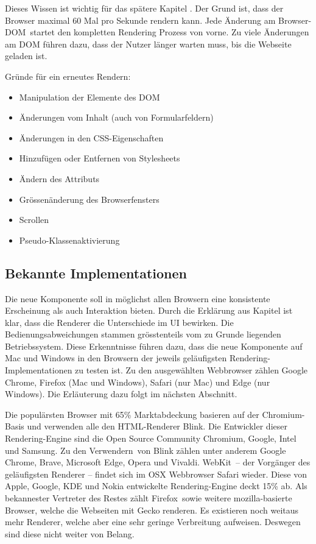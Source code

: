 Dieses Wissen ist wichtig für das spätere Kapitel . 
Der Grund ist, dass der Browser maximal 60 Mal pro Sekunde rendern kann.
Jede Änderung am Browser-DOM\footnotemark \ startet den kompletten Rendering Prozess von vorne.
Zu viele Änderungen am DOM führen dazu, dass der Nutzer länger warten muss, bis die Webseite geladen ist.

Gründe für ein erneutes Rendern\footnotemark :

\begin{itemize}
    \item Manipulation der Elemente des DOM
    \item Änderungen vom Inhalt (auch von Formularfeldern)
    \item Änderungen in den CSS-Eigenschaften
    \item Hinzufügen oder Entfernen von Stylesheets
    \item Ändern des Attributs 
    \item Grössenänderung des Browserfensters
    \item Scrollen
    \item Pseudo-Klassenaktivierung
\end{itemize}


\subsection{Bekannte Implementationen}
\label{sec:implementationsRenderer}

Die neue Komponente soll in möglichst allen Browsern eine konsistente Erscheinung als auch Interaktion bieten.
Durch die Erklärung aus Kapitel  ist klar, dass die Renderer die Unterschiede im UI bewirken.
Die Bedienungsabweichungen stammen grösstenteils vom zu Grunde liegenden Betriebssystem.
Diese Erkenntnisse führen dazu, dass die neue Komponente auf Mac und Windows in den Browsern der jeweils geläufigsten Rendering-Implementationen zu testen ist.
Zu den ausgewählten Webbrowser zählen Google Chrome, Firefox (Mac und Windows), Safari (nur Mac) und Edge (nur Windows).
Die Erläuterung dazu folgt im nächsten Abschnitt.

Die populärsten Browser mit 65\% Marktabdeckung basieren auf der Chromium-Basis und verwenden alle den HTML-Renderer Blink\footnotemark.
Die Entwickler dieser Rendering-Engine sind die Open Source Community Chromium, Google, Intel und Samsung.
Zu den Verwendern\footnotemark \ von Blink zählen unter anderem Google Chrome, Brave, Microsoft Edge, Opera und Vivaldi.
WebKit\footnotemark \ – der Vorgänger des geläufigsten Renderer – findet sich im OSX Webbrowser Safari wieder.
Diese von Apple, Google, KDE und Nokia entwickelte Rendering-Engine deckt 15\% ab.
Als bekannester Vertreter des Restes zählt Firefox\footnotemark \ sowie weitere mozilla-basierte Browser, welche die Webseiten mit Gecko renderen.
Es existieren noch weitaus mehr Renderer, welche aber eine sehr geringe Verbreitung aufweisen.
Deswegen sind diese nicht weiter von Belang.
